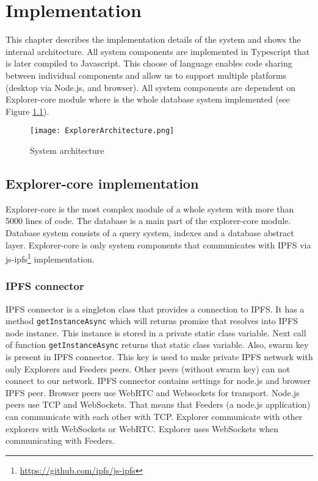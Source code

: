 \chapter{Implementation}
\label{Implementation}
This chapter describes the implementation details of the system and shows the internal architecture. All system components are implemented in Typescript that is later compiled to Javascript. This choose of language enables code sharing between individual components and allow us to support multiple platforms (desktop via Node.js, and browser). All system components are dependent on Explorer-core module where is the whole database system implemented (see Figure \ref{systemArchitecture}). 


\begin{figure}[h]
    \centering
    \texttt{[image: ExplorerArchitecture.png]}
    \caption{System architecture}
    \label{systemArchitecture}
\end{figure}


\section{Explorer-core implementation}
Explorer-core is the most complex module of a whole system with more than 5000 lines of code. The database is a main part of the explorer-core module. Database system consists of a query system, indexes and a database abstract layer. Explorer-core is only system components that communicates with IPFS via js-ipfs\footnote{\url{https://github.com/ipfs/js-ipfs}} implementation.

\subsection{IPFS connector}
IPFS connector is a singleton class that provides a connection to IPFS. It has a method \texttt{getInstanceAsync} which will returns promise that resolves into IPFS node instance. This instance is stored in a private static class variable. Next call of function \texttt{getInstanceAsync} returns that static class variable.
Also, swarm key is present in IPFS connector. This key is used to make private IPFS network with only Explorers and Feeders peers. Other peers (without swarm key) can not connect to our network. IPFS connector contains settings for node.js and browser IPFS peer. Browser peers use WebRTC and Websockets for transport. Node.js peers use TCP and WebSockets. That means that Feeders (a node.js application) can communicate with each other with TCP. Explorer communicate with other explorers with WebSockets or WebRTC. Explorer uses WebSockets when communicating with Feeders.

